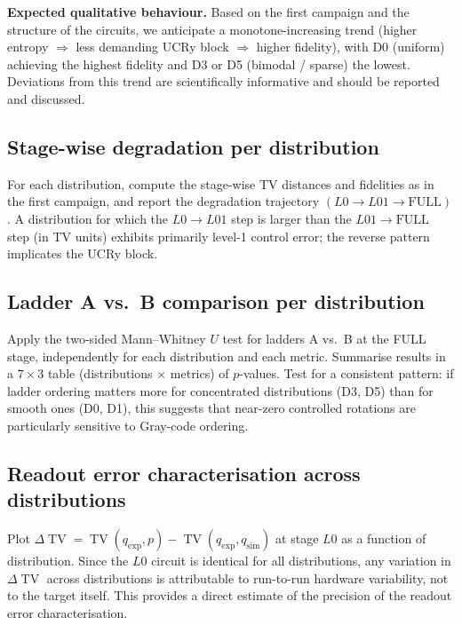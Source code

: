\documentclass[11pt,a4paper]{article}
\newcommand{\TV}{\operatorname{TV}}
\begin{document}
\begin{protocolbox}
\textbf{Expected qualitative behaviour.}
Based on the first campaign and the structure of the circuits,
we anticipate a monotone-increasing trend (higher entropy
$\Rightarrow$ less demanding UCRy block $\Rightarrow$ higher
fidelity), with D0 (uniform) achieving the highest fidelity and
D3 or D5 (bimodal / sparse) the lowest. Deviations from this
trend are scientifically informative and should be reported and
discussed.
\end{protocolbox}

\subsection{Stage-wise degradation per distribution}

For each distribution, compute the stage-wise TV distances and
fidelities as in the first campaign, and report the degradation
trajectory $(L0 \to L01 \to \mathrm{FULL})$.
A distribution for which the $L0 \to L01$ step is larger than the
$L01 \to \mathrm{FULL}$ step (in TV units) exhibits primarily
level-1 control error; the reverse pattern implicates the UCRy
block.

\subsection{Ladder A vs.\ B comparison per distribution}

Apply the two-sided Mann--Whitney $U$ test for ladders A vs.\ B
at the FULL stage, independently for each distribution and each
metric. Summarise results in a $7 \times 3$ table (distributions
$\times$ metrics) of $p$-values. Test for a consistent pattern:
if ladder ordering matters more for concentrated distributions
(D3, D5) than for smooth ones (D0, D1), this suggests that
near-zero controlled rotations are particularly sensitive to
Gray-code ordering.

\subsection{Readout error characterisation across distributions}

Plot $\Delta\TV = \TV(q_{\mathrm{exp}}, p) -
\TV(q_{\mathrm{exp}}, q_{\mathrm{sim}})$ at stage $L0$ as a
function of distribution. Since the $L0$ circuit is identical
for all distributions, any variation in $\Delta\TV$ across
distributions is attributable to run-to-run hardware variability,
not to the target itself. This provides a direct estimate of
the precision of the readout error characterisation.
\end{document}
